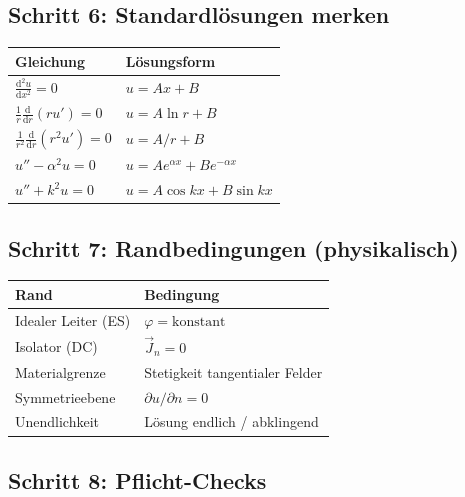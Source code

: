 \documentclass[a4paper]{article}
\newcommand{\imp}[1]{{\color{accent}\bfseries #1}}
\renewcommand{\dd}{\mathrm{d}}
\newcommand{\J}{\vec J}
\begin{document}
\subsection*{Schritt 6: Standardlösungen merken}

\begin{schema}
\begin{tabular}{p{5cm} p{9cm}}
\imp{Gleichung} & \imp{Lösungsform} \\ \hline
$\frac{\dd^2 u}{\dd x^2}=0$ & $u=Ax+B$ \\
$\frac{1}{r}\frac{\dd}{\dd r}(r u')=0$ & $u=A\ln r+B$ \\
$\frac{1}{r^2}\frac{\dd}{\dd r}(r^2 u')=0$ & $u=A/r+B$ \\
$u''-\alpha^2 u=0$ & $u=Ae^{\alpha x}+Be^{-\alpha x}$ \\
$u''+k^2u=0$ & $u=A\cos kx+B\sin kx$ \\
\end{tabular}
\end{schema}

\vspace{2pt}

\subsection*{Schritt 7: Randbedingungen (physikalisch)}

\begin{schema}
\begin{tabular}{p{5cm} p{9cm}}
\imp{Rand} & \imp{Bedingung} \\ \hline
Idealer Leiter (ES) & $\varphi=\text{konstant}$ \\
Isolator (DC) & $\J_n=0$ \\
Materialgrenze & Stetigkeit tangentialer Felder \\
Symmetrieebene & $\partial u/\partial n=0$ \\
Unendlichkeit & Lösung endlich / abklingend \\
\end{tabular}
\end{schema}

\vspace{2pt}

\subsection*{Schritt 8: Pflicht-Checks}
\end{document}
